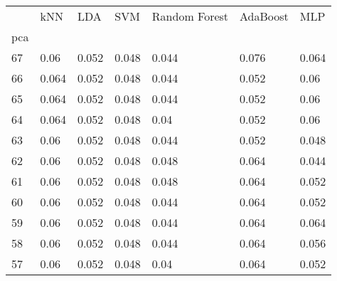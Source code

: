 \begin{tabular}{lllllll}
\toprule
{} &    kNN &    LDA &    SVM & Random Forest & AdaBoost &    MLP \\
pca &        &        &        &               &          &        \\
\midrule
67  &   0.06 &  0.052 &  0.048 &         0.044 &    0.076 &  0.064 \\
66  &  0.064 &  0.052 &  0.048 &         0.044 &    0.052 &   0.06 \\
65  &  0.064 &  0.052 &  0.048 &         0.044 &    0.052 &   0.06 \\
64  &  0.064 &  0.052 &  0.048 &          0.04 &    0.052 &   0.06 \\
63  &   0.06 &  0.052 &  0.048 &         0.044 &    0.052 &  0.048 \\
62  &   0.06 &  0.052 &  0.048 &         0.048 &    0.064 &  0.044 \\
61  &   0.06 &  0.052 &  0.048 &         0.048 &    0.064 &  0.052 \\
60  &   0.06 &  0.052 &  0.048 &         0.044 &    0.064 &  0.052 \\
59  &   0.06 &  0.052 &  0.048 &         0.044 &    0.064 &  0.064 \\
58  &   0.06 &  0.052 &  0.048 &         0.044 &    0.064 &  0.056 \\
57  &   0.06 &  0.052 &  0.048 &          0.04 &    0.064 &  0.052 \\
\bottomrule
\end{tabular}
